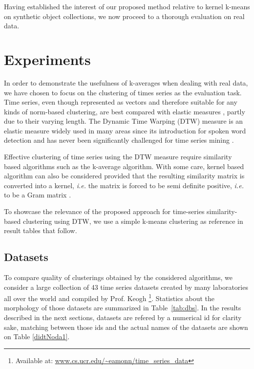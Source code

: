\documentclass[twoside,11pt]{article}
\begin{document}
Having established the interest of our proposed method relative to kernel k-means on synthetic object collections, we now proceed to a thorough evaluation on real data.

\section{Experiments}
\label{sec:experiments}

In order to demonstrate the usefulness of k-averages when dealing with real data, we have chosen to focus on the clustering of times series as the evaluation task. Time series, even though represented as vectors and therefore suitable for any kinds of norm-based clustering, are best compared with elastic measures \citep{Ding:2008:QMT:1454159.1454226, Wang:2013:ECR:2429736.2429754}, partly due to their varying length. The Dynamic Time Warping (DTW) measure is an elastic measure widely used in many areas since its introduction for spoken word detection \citep{1163055} and has never been significantly challenged for time series mining \citep{conf/kdd/BerndtC94, Rakthanmanon:2013:ABD:2513092.2500489}.

Effective clustering of time series using the DTW measure require similarity based algorithms such as the k-average algorithm. With some care, kernel based algorithm can also be considered provided that the resulting similarity matrix is converted into a kernel, \textit{i.e.} the matrix is forced to be semi definite positive, \textit{i.e.} to be a Gram matrix \citep{Lanckriet:2004:LKM:1005332.1005334}.


To showcase the relevance of the proposed approach for time-series similarity-based clustering using DTW, we use a simple k-means clustering as reference in result tables that follow.

\subsection{Datasets}

To compare quality of clusterings obtained by the considered algorithms, we consider a large collection of 43 time series datasets created by many laboratories all over the world and compiled by Prof. Keogh \footnote{Available at: \url{www.cs.ucr.edu/~eamonn/time_series_data}}.  Statistics about the morphology of those datasets are summarized in Table~\ref{tab:dbs}. In the results described in the next sections, datasets are refered by a numerical id for clarity sake, matching between those ids and the actual names of the datasets are shown on Table \ref{didtNoda1}.
\end{document}
